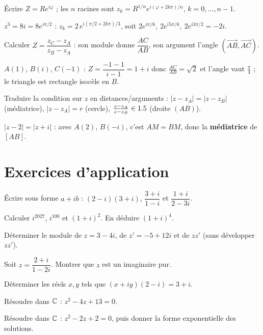 Écrire $Z=Re^{i\varphi}$ ; les $n$ racines sont $z_k=R^{1/n}e^{i(\varphi+2k\pi)/n}$,
$k=0,\dots,n-1$.
\begin{exemple}
$z^{3}=8i=8e^{i\pi/2}$ : $z_k=2\,e^{i(\pi/2+2k\pi)/3}$, soit $2e^{i\pi/6},\ 2e^{i5\pi/6},\
2e^{i3\pi/2}=-2i$.
\end{exemple}

Calculer $Z=\dfrac{z_C-z_A}{z_B-z_A}$ : son module donne $\dfrac{AC}{AB}$, son argument l'angle
$(\overrightarrow{AB},\overrightarrow{AC})$.
\begin{exemple}
$A(1)$, $B(i)$, $C(-1)$ : $Z=\dfrac{-1-1}{i-1}=1+i$ donc $\frac{AC}{AB}=\sqrt2$ et l'angle vaut
$\frac\pi4$ ; le triangle est rectangle isocèle en $B$.
\end{exemple}

Traduire la condition sur $z$ en distances/arguments : $|z-z_A|=|z-z_B|$ (médiatrice),
$|z-z_A|=r$ (cercle), $\frac{z-z_A}{z-z_B}\in1.5$ (droite $(AB)$).
\begin{exemple}
$|z-2|=|z+i|$ : avec $A(2)$, $B(-i)$, c'est $AM=BM$, donc la \textbf{médiatrice} de $[AB]$.
\end{exemple}

\section{Exercices d'application}

\exo{} Écrire sous forme $a+ib$ : $(2-i)(3+i)$, $\dfrac{3+i}{1-i}$ et $\dfrac{1+i}{2-3i}$.

\exo{} Calculer $i^{2027}$, $i^{100}$ et $(1+i)^{2}$. En déduire $(1+i)^{4}$.

\exo{} Déterminer le module de $z=3-4i$, de $z'=-5+12i$ et de $zz'$ (sans développer $zz'$).

\exo{} Soit $z=\dfrac{2+i}{1-2i}$. Montrer que $z$ est un imaginaire pur.

\exo{} Déterminer les réels $x,y$ tels que $(x+iy)(2-i)=3+i$.

\exo{} Résoudre dans $\mathbb{C}$ : $z^{2}-4z+13=0$.

\exo{} Résoudre dans $\mathbb{C}$ : $z^{2}-2z+2=0$, puis donner la forme exponentielle des
solutions.

